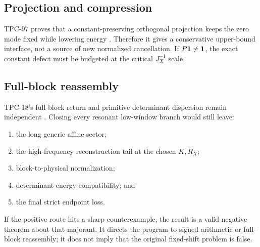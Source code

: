 \subsection{Projection and compression}

TPC-97 proves that a constant-preserving orthogonal projection keeps
the zero mode fixed while lowering energy \citep{WangTPC97}.
Therefore it gives a conservative upper-bound interface, not a
source of new normalized cancellation.  If \(P\mathbf 1\ne\mathbf 1\), the
exact constant defect must be budgeted at the critical \(J_X^{-1}\)
scale.

\subsection{Full-block reassembly}

TPC-18's full-block return and primitive determinant dispersion
remain independent \citep{WangTPC18}.  Closing every resonant
low-window branch would still leave:
\begin{enumerate}[leftmargin=2em]
\item the long generic affine sector;
\item the high-frequency reconstruction tail at the chosen
  \(K,R_X\);
\item block-to-physical normalization;
\item determinant-energy compatibility; and
\item the final strict endpoint loss.
\end{enumerate}

\begin{remark}
If the positive route hits a sharp counterexample, the result is a
valid negative theorem about that majorant.  It directs the program
to signed arithmetic or full-block reassembly; it does not imply
that the original fixed-shift problem is false.
\end{remark}
